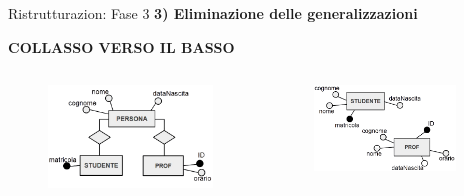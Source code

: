 \begin{frame}{Ristrutturazion: Fase 3}
\textbf{3) Eliminazione delle generalizzazioni}
\\\vspace{2em}
\begin{center}
    \textbf{COLLASSO VERSO IL BASSO}
\end{center}
\begin{columns}
        \begin{column}{0.5\textwidth}
            \begin{figure}[h]
        \centering
        \includegraphics[width=1\textwidth]{img/i6.png}
    \end{figure}
        \end{column}
        \begin{column}{0.5\textwidth}
            \begin{figure}[h]
        \centering
        \includegraphics[width=0.9\textwidth]{img/i9.png}
    \end{figure}
        \end{column}
    \end{columns}
\end{frame}
